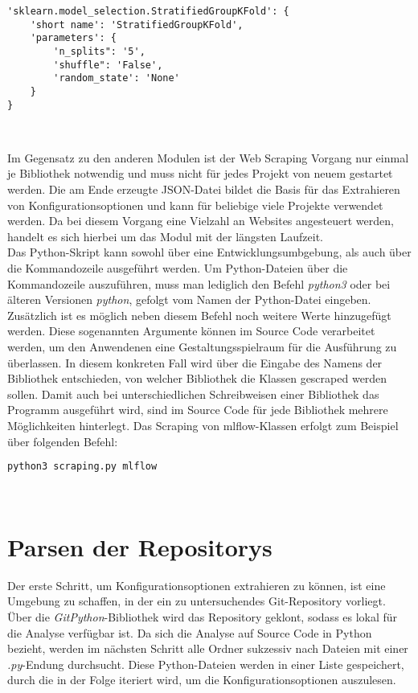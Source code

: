 \documentclass[german,bachelor]{swsLeipzig}
\begin{document}
\begin{lstlisting}[frame=single, basicstyle=\small]
'sklearn.model_selection.StratifiedGroupKFold': {
    'short name': 'StratifiedGroupKFold',
    'parameters': {
        'n_splits": '5',
        'shuffle": 'False',
        'random_state': 'None'
    }
}
\end{lstlisting}
\

Im Gegensatz zu den anderen Modulen ist der Web Scraping Vorgang nur einmal je Bibliothek notwendig und muss nicht für jedes Projekt
von neuem gestartet werden.
Die am Ende erzeugte JSON-Datei bildet die Basis für das Extrahieren von Konfigurationsoptionen und kann für beliebige viele
Projekte verwendet werden.
Da bei diesem Vorgang eine Vielzahl an Websites angesteuert werden, handelt es sich hierbei um das Modul mit der längsten Laufzeit.\\

Das Python-Skript kann sowohl über eine Entwicklungsumbgebung, als auch über die Kommandozeile ausgeführt werden.
Um Python-Dateien über die Kommandozeile auszuführen, muss man lediglich den Befehl \textit{python3} oder bei älteren
Versionen \textit{python}, gefolgt vom Namen der Python-Datei eingeben.
Zusätzlich ist es möglich neben diesem Befehl noch weitere Werte hinzugefügt werden.
Diese sogenannten Argumente können im Source Code verarbeitet werden, um den Anwendenen eine Gestaltungsspielraum für
die Ausführung zu überlassen.
In diesem konkreten Fall wird über die Eingabe des Namens der Bibliothek entschieden, von welcher Bibliothek die
Klassen gescraped werden sollen.
Damit auch bei unterschiedlichen Schreibweisen einer Bibliothek das Programm ausgeführt wird, sind im Source Code für jede
Bibliothek mehrere Möglichkeiten hinterlegt.
Das Scraping von mlflow-Klassen erfolgt zum Beispiel über folgenden Befehl:\\

\begin{lstlisting}[language=bash, frame=single, basicstyle=\small]
python3 scraping.py mlflow
\end{lstlisting}
\

\section{Parsen der Repositorys}
Der erste Schritt, um Konfigurationsoptionen extrahieren zu können, ist eine Umgebung zu schaffen, in der ein zu untersuchendes
Git-Repository vorliegt.
Über die \textit{GitPython}-Bibliothek wird das Repository geklont, sodass es lokal für die Analyse verfügbar ist.
Da sich die Analyse auf Source Code in Python bezieht, werden im nächsten Schritt alle Ordner sukzessiv nach Dateien mit
einer \textit{.py}-Endung durchsucht.
Diese Python-Dateien werden in einer Liste gespeichert, durch die in der Folge iteriert wird, um die Konfigurationsoptionen auszulesen. \\
\end{document}
